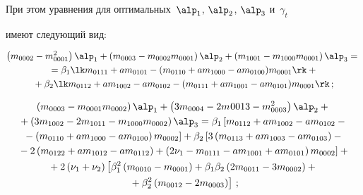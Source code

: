  При этом уравнения для оптимальных~$\alp_1$, $\alp_2$, $\alp_3$ и~$\gamma_t$ 


 имеют сле\-ду\-ющий вид:


 \begin{multline*}


\left(m_{0002}-m_{0001}^2\right)\alp_1 + \left(m_{0003}-m_{0002}m_{0001}\right)\alp_2 +


\left(m_{1001}-m_{1000}m_{0001}\right)\alp_3={}\\


{}= \beta_1 \lk m_{0111}+am_{0101}-(m_{0110}+am_{1000}-am_{0100})m_{0001}\rk+{}\\


{}+ \beta_2 \lk m_{0112}+ am_{1002}-am_{0102}-(m_{0111}+am_{1001}-am_{0101})m_{0001}\rk\,;




\end{multline*}





\vspace*{-12pt}





\noindent


 \begin{multline*}


\left(m_{0003}-m_{0001}m_{0002}\right)\alp_1+\left(3m_{0004}-2m_{}0013-m_{0003}^2\right)\alp_2+{}\\


{}+\left(3m_{1002}-2m_{1011}-m_{1000}m_{0002}\right)\alp_3=


\beta_1 \left[ m_{0112}+am_{1002}-am_{0102}-{}\right.\\


\left.{}- \left(m_{0110}+am_{1000}-am_{0100}\right)m_{0002}\right] +


\beta_2 \left[ 3\left(m_{0113}+am_{1003}-am_{0103}\right)-{}\right.\\


\left.{}- 2\left(m_{0122}+am_{1012}-am_{0112}\right) +


\left(2\nu_1 -m_{0111}-am_{1001}+am_{0101}\right)m_{0002}\right]+{}\\


{}+ 2\left(\nu_1+\nu_2\right)\left[ \beta_1^2 


\left(m_{0010}-m_{0001}\right)+\beta_1\beta_2\left(2m_{0011}-3m_{0002}\right)


 + {}\right.\\


 \left.{}+ \beta_2^2 \left(m_{0012}-2m_{0003}\right)\right]\,;




 \end{multline*}





